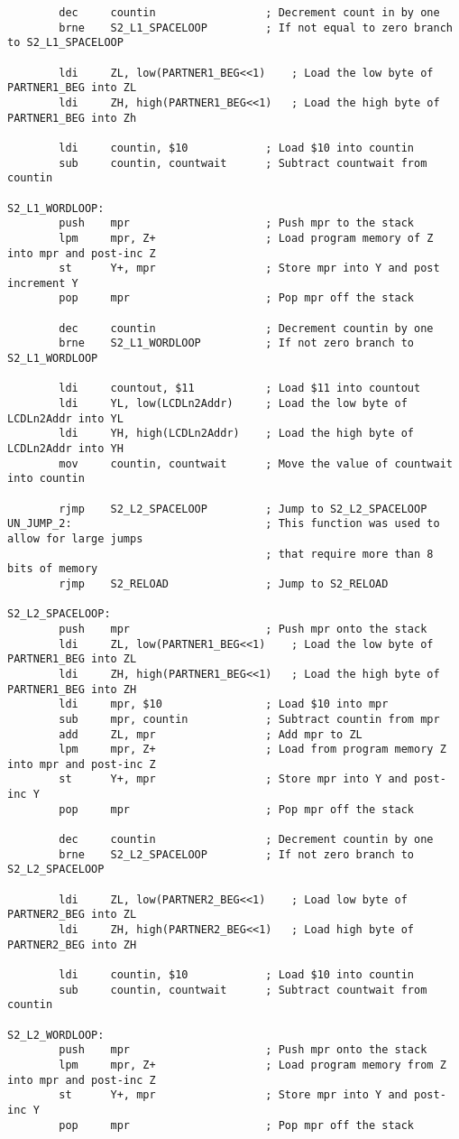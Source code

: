 \documentclass[12pt, letterpaper]{article}
\begin{document}
\begin{verbatim}
		dec		countin					; Decrement count in by one
		brne	S2_L1_SPACELOOP			; If not equal to zero branch to S2_L1_SPACELOOP
		
		ldi		ZL, low(PARTNER1_BEG<<1)	; Load the low byte of PARTNER1_BEG into ZL
		ldi		ZH, high(PARTNER1_BEG<<1)	; Load the high byte of PARTNER1_BEG into Zh

		ldi		countin, $10			; Load $10 into countin
		sub		countin, countwait		; Subtract countwait from countin

S2_L1_WORDLOOP:
		push	mpr						; Push mpr to the stack
		lpm		mpr, Z+					; Load program memory of Z into mpr and post-inc Z
		st		Y+, mpr					; Store mpr into Y and post increment Y
		pop		mpr						; Pop mpr off the stack
						
		dec		countin					; Decrement countin by one
		brne	S2_L1_WORDLOOP			; If not zero branch to S2_L1_WORDLOOP

		ldi		countout, $11			; Load $11 into countout
		ldi		YL, low(LCDLn2Addr)		; Load the low byte of LCDLn2Addr into YL
		ldi		YH, high(LCDLn2Addr)	; Load the high byte of LCDLn2Addr into YH
		mov		countin, countwait		; Move the value of countwait into countin

		rjmp	S2_L2_SPACELOOP			; Jump to S2_L2_SPACELOOP
UN_JUMP_2:								; This function was used to allow for large jumps 
										; that require more than 8 bits of memory
		rjmp	S2_RELOAD				; Jump to S2_RELOAD

S2_L2_SPACELOOP:
		push	mpr						; Push mpr onto the stack
		ldi		ZL, low(PARTNER1_BEG<<1)	; Load the low byte of PARTNER1_BEG into ZL
		ldi		ZH, high(PARTNER1_BEG<<1)	; Load the high byte of PARTNER1_BEG into ZH
		ldi		mpr, $10				; Load $10 into mpr
		sub		mpr, countin			; Subtract countin from mpr
		add		ZL,	mpr					; Add mpr to ZL
		lpm		mpr, Z+					; Load from program memory Z into mpr and post-inc Z
		st		Y+, mpr					; Store mpr into Y and post-inc Y
		pop		mpr						; Pop mpr off the stack

		dec		countin					; Decrement countin by one
		brne	S2_L2_SPACELOOP			; If not zero branch to S2_L2_SPACELOOP

		ldi		ZL, low(PARTNER2_BEG<<1)	; Load low byte of PARTNER2_BEG into ZL
		ldi		ZH, high(PARTNER2_BEG<<1)	; Load high byte of PARTNER2_BEG into ZH

		ldi		countin, $10			; Load $10 into countin
		sub		countin, countwait		; Subtract countwait from countin

S2_L2_WORDLOOP:
		push	mpr						; Push mpr onto the stack
		lpm		mpr, Z+					; Load program memory from Z into mpr and post-inc Z
		st		Y+, mpr					; Store mpr into Y and post-inc Y
		pop		mpr						; Pop mpr off the stack


\end{verbatim}
\end{document}
